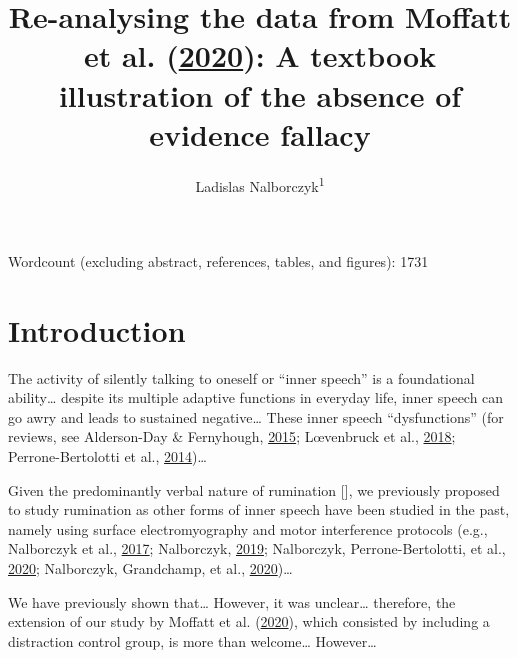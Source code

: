 \documentclass[
  english,
  man,floatsintext]{apa6}
\author{Ladislas Nalborczyk\textsuperscript{1}}
\affiliation{
\vspace{0.5cm}
\textsuperscript{1} Univ. Grenoble Alpes, CNRS, Grenoble INP, GIPSA-lab, 38000 Grenoble, France}
\title{Re-analysing the data from Moffatt et al. (\protect\hyperlink{ref-moffatt_inner_2020}{2020}): A textbook illustration of the absence of evidence fallacy}
\date{}
\begin{document}
\maketitle

Wordcount (excluding abstract, references, tables, and figures): 1731

\newpage

\hypertarget{introduction}{%
\section{Introduction}\label{introduction}}

The activity of silently talking to oneself or ``inner speech'' is a foundational ability\ldots{} despite its multiple adaptive functions in everyday life, inner speech can go awry and leads to sustained negative\ldots{} These inner speech ``dysfunctions'' (for reviews, see Alderson-Day \& Fernyhough, \protect\hyperlink{ref-alderson-day_inner_2015}{2015}; Lœvenbruck et al., \protect\hyperlink{ref-loevenbruck_cognitive_2018}{2018}; Perrone-Bertolotti et al., \protect\hyperlink{ref-perrone-bertolotti_what_2014}{2014})\ldots{}

Given the predominantly verbal nature of rumination {[}{]}, we previously proposed to study rumination as other forms of inner speech have been studied in the past, namely using surface electromyography and motor interference protocols (e.g., Nalborczyk et al., \protect\hyperlink{ref-nalborczyk_orofacial_2017}{2017}; Nalborczyk, \protect\hyperlink{ref-nalborczyk_understanding_2019}{2019}; Nalborczyk, Perrone-Bertolotti, et al., \protect\hyperlink{ref-nalborczyk_articulatory_2020}{2020}; Nalborczyk, Grandchamp, et al., \protect\hyperlink{ref-nalborczyk_can_2020}{2020})\ldots{}

We have previously shown that\ldots{} However, it was unclear\ldots{} therefore, the extension of our study by Moffatt et al. (\protect\hyperlink{ref-moffatt_inner_2020}{2020}), which consisted by including a distraction control group, is more than welcome\ldots{} However\ldots{}
\end{document}
